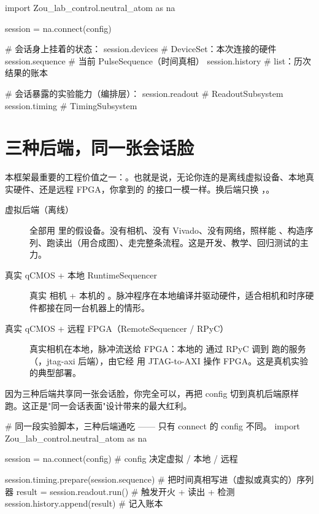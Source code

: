 \documentclass[11pt,oneside,openany]{book}
\begin{document}
\begin{codeblock}[Python]
import Zou_lab_control.neutral_atom as na

session = na.connect(config)

# 会话身上挂着的状态：
session.devices       # DeviceSet：本次连接的硬件
session.sequence      # 当前 PulseSequence（时间真相）
session.history       # list：历次结果的账本

# 会话暴露的实验能力（编排层）：
session.readout       # ReadoutSubsystem
session.timing        # TimingSubsystem
\end{codeblock}

\section{三种后端，同一张会话脸}

本框架最重要的工程价值之一：。也就是说，无论你连的是离线虚拟设备、本地真实硬件、还是远程 FPGA，你拿到的  的接口一模一样。换后端只换 ，。

\begin{description}
\item[虚拟后端（离线）] 全部用  里的假设备。没有相机、没有 Vivado、没有网络，照样能 、构造序列、跑读出（用合成图）、走完整条流程。这是开发、教学、回归测试的主力。
\item[真实 qCMOS + 本地 RuntimeSequencer] 真实  相机 + 本机的 。脉冲程序在本地编译并驱动硬件，适合相机和时序硬件都接在同一台机器上的情形。
\item[真实 qCMOS + 远程 FPGA（RemoteSequencer / RPyC）] 真实相机在本地，脉冲流送给 FPGA：本地的  通过 RPyC 调到  跑的服务（，jtag-axi 后端），由它经  用 JTAG-to-AXI 操作 FPGA。这是真机实验的典型部署。
\end{description}

\begin{notebox}
因为三种后端共享同一张会话脸，你完全可以，再把 config 切到真机后端原样跑。这正是"同一会话表面"设计带来的最大红利。
\end{notebox}

\begin{codeblock}[Python]
# 同一段实验脚本，三种后端通吃 —— 只有 connect 的 config 不同。
import Zou_lab_control.neutral_atom as na

session = na.connect(config)          # config 决定虚拟 / 本地 / 远程

session.timing.prepare(session.sequence)   # 把时间真相写进（虚拟或真实的）序列器
result = session.readout.run()             # 触发开火 + 读出 + 检测
session.history.append(result)             # 记入账本
\end{codeblock}
\end{document}
